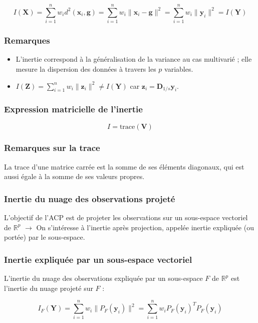 \documentclass[10pt,a4paper]{article}
\begin{document}
\[
I(\mathbf{X}) = \sum_{i=1}^n w_i d^2(\mathbf{x}_i, \mathbf{g}) = \sum_{i=1}^n w_i \|\mathbf{x}_i - \mathbf{g}\|^2 = \sum_{i=1}^n w_i \|\mathbf{y}_i\|^2 = I(\mathbf{Y})
\]

\subsubsection*{Remarques}
\begin{itemize}
    \item L'inertie correspond à la généralisation de la variance au cas multivarié ; elle mesure la dispersion des données à travers les $p$ variables.
    \item $I(\mathbf{Z}) = \sum_{i=1}^n w_i \|\mathbf{z}_i\|^2 \neq I(\mathbf{Y})$ car $\mathbf{z}_i = \mathbf{D}_{1/s} \mathbf{y}_i$.
\end{itemize}

\subsubsection*{Expression matricielle de l'inertie}
\[
I = \text{trace}(\mathbf{V})
\]

\subsubsection*{Remarques sur la trace}
La trace d'une matrice carrée est la somme de ses éléments diagonaux, qui est aussi égale à la somme de ses valeurs propres.

\subsubsection*{Inertie du nuage des observations projeté}
L'objectif de l'ACP est de projeter les observations sur un sous-espace vectoriel de $\mathbb{R}^p$ $\rightarrow$ On s'intéresse à l'inertie après projection, appelée inertie expliquée (ou portée) par le sous-espace.

\subsubsection*{Inertie expliquée par un sous-espace vectoriel}
L'inertie du nuage des observations expliquée par un sous-espace $F$ de $\mathbb{R}^p$ est l'inertie du nuage projeté sur $F$ :

\[
I_F(\mathbf{Y}) = \sum_{i=1}^n w_i \|P_F(\mathbf{y}_i)\|^2 = \sum_{i=1}^n w_i P_F(\mathbf{y}_i)^T P_F(\mathbf{y}_i)
\]
\end{document}
